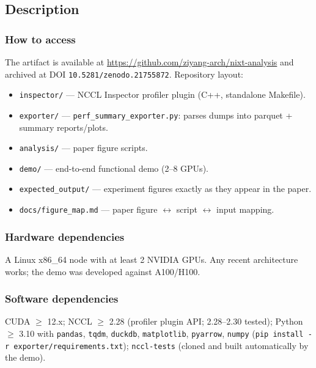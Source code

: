 \documentclass[10pt,twocolumn]{article}
\begin{document}
\subsection{Description}

\subsubsection{How to access}

The artifact is available at
\url{https://github.com/ziyang-arch/nixt-analysis}
and archived at DOI \texttt{10.5281/zenodo.21755872}.
Repository layout:

{\small
\begin{itemize}
  \item \texttt{inspector/} --- NCCL Inspector profiler plugin
        (C++, standalone Makefile).
  \item \texttt{exporter/} ---
        \texttt{perf\_summary\_exporter.py}: parses dumps into
        parquet + summary reports/plots.
  \item \texttt{analysis/} --- paper figure scripts.
  \item \texttt{demo/} --- end-to-end functional demo (2--8 GPUs).
  \item \texttt{expected\_output/} --- experiment figures exactly
        as they appear in the paper.
  \item \texttt{docs/figure\_map.md} --- paper figure
        $\leftrightarrow$ script $\leftrightarrow$ input mapping.
\end{itemize}
}

\subsubsection{Hardware dependencies}

A Linux x86\_64 node with at least 2 NVIDIA GPUs. Any recent
architecture works; the demo was developed against A100/H100.

\subsubsection{Software dependencies}

CUDA $\geq$ 12.x; NCCL $\geq$ 2.28 (profiler plugin API; 2.28--2.30
tested); Python $\geq$ 3.10 with \texttt{pandas}, \texttt{tqdm},
\texttt{duckdb}, \texttt{matplotlib}, \texttt{pyarrow},
\texttt{numpy} (\texttt{pip install -r exporter/requirements.txt});
\texttt{nccl-tests} (cloned and built automatically by the demo).
\end{document}

